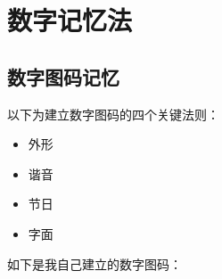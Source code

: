 
\chapter{数字记忆法}

\section{数字图码记忆}

以下为建立数字图码的四个关键法则：
\begin{itemize}
\item 外形
\item 谐音
\item 节日
\item 字面
\end{itemize}

如下是我自己建立的数字图码：
